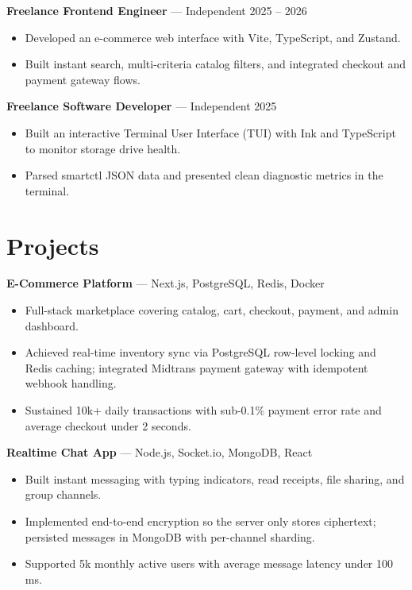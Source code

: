 \documentclass[11pt,a4paper]{article}
\newcommand{\cvheading}[1]{\textbf{#1}}
\begin{document}
\vspace{4pt}
\cvheading{Freelance Frontend Engineer} --- Independent \hfill 2025 -- 2026
\begin{itemize}[leftmargin=1.2em,itemsep=1pt,topsep=2pt]
  \item Developed an e-commerce web interface with Vite, TypeScript, and Zustand.
  \item Built instant search, multi-criteria catalog filters, and integrated checkout and payment gateway flows.
\end{itemize}

\vspace{4pt}
\cvheading{Freelance Software Developer} --- Independent \hfill 2025
\begin{itemize}[leftmargin=1.2em,itemsep=1pt,topsep=2pt]
  \item Built an interactive Terminal User Interface (TUI) with Ink and TypeScript to monitor storage drive health.
  \item Parsed smartctl JSON data and presented clean diagnostic metrics in the terminal.
\end{itemize}

\section*{Projects}

\cvheading{E-Commerce Platform} --- Next.js, PostgreSQL, Redis, Docker
\begin{itemize}[leftmargin=1.2em,itemsep=1pt,topsep=2pt]
  \item Full-stack marketplace covering catalog, cart, checkout, payment, and admin dashboard.
  \item Achieved real-time inventory sync via PostgreSQL row-level locking and Redis caching; integrated Midtrans payment gateway with idempotent webhook handling.
  \item Sustained 10k+ daily transactions with sub-0.1\% payment error rate and average checkout under 2 seconds.
\end{itemize}

\vspace{4pt}
\cvheading{Realtime Chat App} --- Node.js, Socket.io, MongoDB, React
\begin{itemize}[leftmargin=1.2em,itemsep=1pt,topsep=2pt]
  \item Built instant messaging with typing indicators, read receipts, file sharing, and group channels.
  \item Implemented end-to-end encryption so the server only stores ciphertext; persisted messages in MongoDB with per-channel sharding.
  \item Supported 5k monthly active users with average message latency under 100 ms.
\end{itemize}
\end{document}
